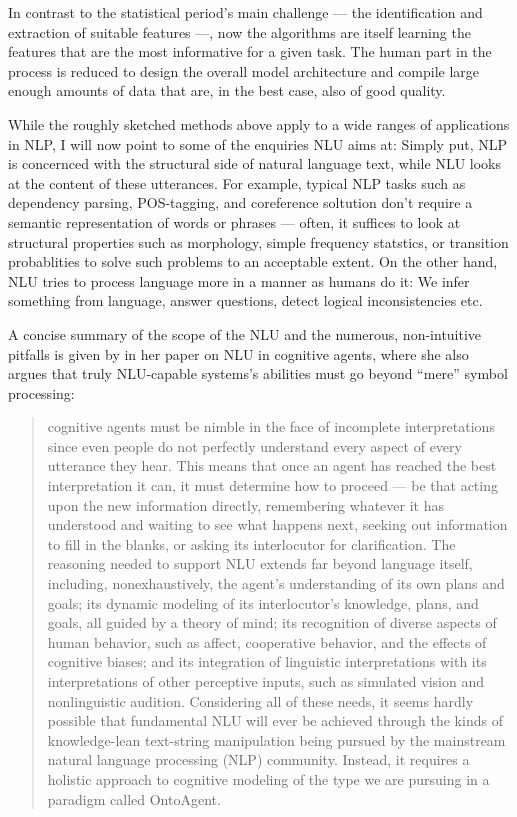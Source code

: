 In contrast to the statistical
period's main challenge --- the identification and extraction of suitable features ---, now the
algorithms are itself learning the features that are the most informative for a given task. The
human part in the process is reduced to design the overall model architecture and compile large
enough amounts of data that are, in the best case, also of good quality.

While the roughly sketched methods above apply to a wide ranges of applications in NLP, I will now
point to some of the enquiries NLU aims at: Simply put, NLP is concernced with the structural side
of natural language text, while NLU looks at the content of these utterances. For example, typical
NLP tasks such as dependency parsing, POS-tagging, and coreference soltution don't require a
semantic representation of words or phrases --- often, it suffices to look at structural properties
such as morphology, simple frequency statstics, or transition probablities to solve such problems
to an acceptable extent. On the other hand, NLU tries to process language more in a manner as
humans do it: We infer something from language, answer questions, detect logical inconsistencies
etc.

{\color{red} A concise summary of the scope of the NLU and the numerous, non-intuitive pitfalls is given by
\cite{mcshane2017natural} in her paper on NLU in cognitive agents, where she also argues that
truly NLU-capable systems's abilities must go beyond ``mere'' symbol processing:

\begin{quote}
  cognitive agents must be nimble in the face of incomplete interpretations since even people do not
  perfectly understand every aspect of every utterance they hear. This means that once an agent
  has reached the best interpretation it can, it must determine how to proceed — be that acting
  upon the new information directly, remembering whatever it has understood and waiting to see
  what happens next, seeking out information to fill in the blanks, or asking its interlocutor
  for clarification. The reasoning needed to support NLU extends far beyond language itself,
  including, nonexhaustively, the agent’s understanding of its own plans and goals; its dynamic
  modeling of its interlocutor’s knowledge, plans, and goals, all guided by a theory of mind;
  its recognition of diverse aspects of human behavior, such as affect, cooperative behavior,
  and the effects of cognitive biases; and its integration of linguistic interpretations with
  its interpretations of other perceptive inputs, such as simulated vision and nonlinguistic
  audition. Considering all of these needs, it seems hardly possible that fundamental NLU
  will ever be achieved through the kinds of knowledge-lean text-string manipulation being
  pursued by the mainstream natural language processing (NLP) community. Instead, it requires
  a holistic approach to cognitive modeling of the type we are pursuing in a paradigm called
  OntoAgent.
\end{quote}}

